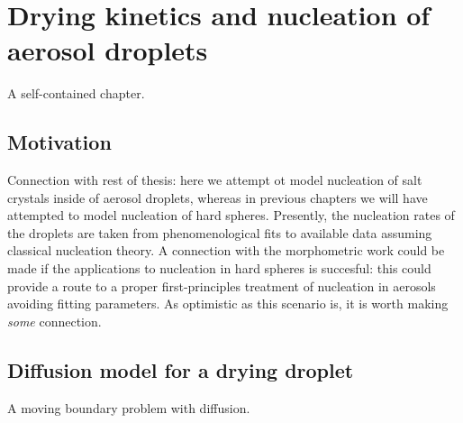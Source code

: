 \documentclass[11pt,twoside]{report}
\begin{document}
\chapter{Drying kinetics and nucleation of aerosol droplets}
A self-contained chapter.

\section{Motivation}
Connection with rest of thesis: here we attempt ot model nucleation of salt crystals inside of aerosol droplets, whereas in previous chapters we will have attempted to model nucleation of hard spheres.
Presently, the nucleation rates of the droplets are taken from phenomenological fits to available data assuming classical nucleation theory.
A connection with the morphometric work could be made if the applications to nucleation in hard spheres is succesful: this could provide a route to a proper first-principles treatment of nucleation in aerosols avoiding fitting parameters.
As optimistic as this scenario is, it is worth making \emph{some} connection.

\section{Diffusion model for a drying droplet}
A moving boundary problem with diffusion.
\end{document}
